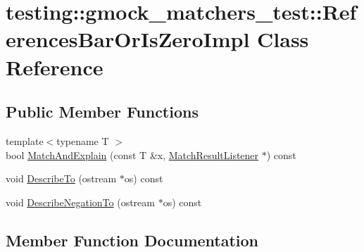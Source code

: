\hypertarget{classtesting_1_1gmock__matchers__test_1_1_references_bar_or_is_zero_impl}{}\section{testing\+:\+:gmock\+\_\+matchers\+\_\+test\+:\+:References\+Bar\+Or\+Is\+Zero\+Impl Class Reference}
\label{classtesting_1_1gmock__matchers__test_1_1_references_bar_or_is_zero_impl}
\subsection*{Public Member Functions}
\begin{DoxyCompactItemize}
\item 
{\footnotesize template$<$typename T $>$ }\\bool \hyperlink{classtesting_1_1gmock__matchers__test_1_1_references_bar_or_is_zero_impl_ac74ff2f707bebea05a995beb77c77041}{Match\+And\+Explain} (const T \&x, \hyperlink{classtesting_1_1_match_result_listener}{Match\+Result\+Listener} $\ast$) const
\item 
void \hyperlink{classtesting_1_1gmock__matchers__test_1_1_references_bar_or_is_zero_impl_a8d8496ad72753723598efd45e6a4dcbf}{Describe\+To} (ostream $\ast$os) const
\item 
void \hyperlink{classtesting_1_1gmock__matchers__test_1_1_references_bar_or_is_zero_impl_a849b65d96bf7a31b7b0e81005e466605}{Describe\+Negation\+To} (ostream $\ast$os) const
\end{DoxyCompactItemize}


\subsection{Member Function Documentation}
\mbox{\label{classtesting_1_1gmock__matchers__test_1_1_references_bar_or_is_zero_impl_a849b65d96bf7a31b7b0e81005e466605}} 
